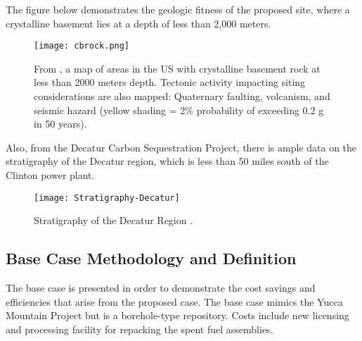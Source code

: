   
  
  The figure below demonstrates the geologic fitness of the proposed site, where 
  a crystalline basement lies at a depth of less than 2,000 meters.



\begin{figure}[!h] 
  \centering
  \texttt{[image: cbrock.png]}	
        \caption{From \cite{Perry_2015}, a map of areas in the US with 
        crystalline basement rock at less than 2000 meters depth. Tectonic 
        activity impacting siting considerations are also mapped:  Quaternary 
        faulting, volcanism, and seismic hazard (yellow shading = 2\% 
        probability of exceeding 0.2 g in 50 years).}
  \label{fig:cbrock}
\end{figure}

  
  \iffalse

\begin{figure}[!h] 
  \centering
  \texttt{[image: Crystalline-Thickness]}	
  \caption{Depth of Crystalline Rock
  \cite{Perry_2015}.}
  \label{fig:Depth}
\end{figure}

 \fi
  
  
  Also, from the Decatur Carbon Sequestration Project, there is ample data
  on the stratigraphy of the Decatur region, which is less than 50 miles south
  of the Clinton power plant.
 
  
  
  
\begin{figure}[!h] 
  \centering
  \texttt{[image: Stratigraphy-Decatur]}	
  \caption{Stratigraphy of the Decatur Region
  \cite{McDonald_2012}.}
  \label{fig:Stratigraphy}
\end{figure}
  
\subsection{Base Case Methodology and Definition}
The base case is presented in order to demonstrate the cost savings and efficiencies 
that arise from the proposed case. The base case mimics the Yucca Mountain Project
but is a borehole-type repository. Costs include new licensing and processing facility
 for repacking the spent fuel assemblies.


